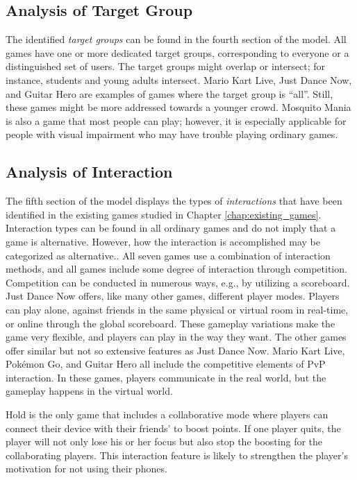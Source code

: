 \subsection{Analysis of Target Group}
The identified \textit{target groups} can be found in the fourth section of the model. All games have one or more dedicated target groups, corresponding to everyone or a distinguished set of users. The target groups might overlap or intersect; for instance, students and young adults intersect. Mario Kart Live, Just Dance Now, and Guitar Hero are examples of games where the target group is “all”. Still, these games might be more addressed towards a younger crowd. Mosquito Mania is also a game that most people can play; however, it is especially applicable for people with visual impairment who may have trouble playing ordinary games.

\subsection{Analysis of Interaction}
The fifth section of the model displays the types of \textit{interactions} that have been identified in the existing games studied in Chapter \ref{chap:existing_games}. Interaction types can be found in all ordinary games and do not imply that a game is alternative. However, how the interaction is accomplished may be categorized as alternative.. All seven games use a combination of interaction methods, and all games include some degree of interaction through competition. Competition can be conducted in numerous ways, e.g., by utilizing a scoreboard. Just Dance Now offers, like many other games, different player modes. Players can play alone, against friends in the same physical or virtual room in real-time, or online through the global scoreboard. These gameplay variations make the game very flexible, and players can play in the way they want. The other games offer similar but not so extensive features as Just Dance Now. Mario Kart Live, Pokémon Go, and Guitar Hero all include the competitive elements of PvP interaction. In these games, players communicate in the real world, but the gameplay happens in the virtual world.

Hold is the only game that includes a collaborative mode where players can connect their device with their friends’ to boost points. If one player quits, the player will not only lose his or her focus but also stop the boosting for the collaborating players. This interaction feature is likely to strengthen the player’s motivation for not using their phones. 


